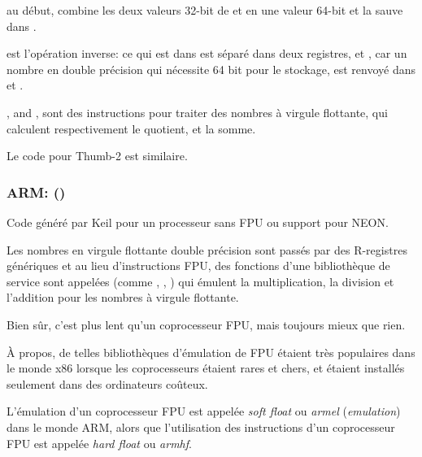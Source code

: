  au début, combine les deux valeurs 32-bit de  et 
en une valeur 64-bit et la sauve dans .

 est l'opération inverse: ce qui est dans  est séparé
dans deux registres,  et , car un nombre en double précision qui
nécessite 64 bit pour le stockage, est renvoyé dans  et .

,  and , 
sont des instructions pour traiter des nombres à virgule flottante, qui calculent
respectivement le \gls{quotient},  et la somme.

Le code pour Thumb-2 est similaire.

\subsubsection{ARM: \OptimizingKeilVI (\ThumbMode)}



Code généré par Keil pour un processeur sans FPU ou support pour NEON.

Les nombres en virgule flottante double précision sont passés par des R-registres
génériques et au lieu d'instructions FPU, des fonctions d'une bibliothèque de service
sont appelées (comme , , )
qui émulent la multiplication, la division et l'addition pour les nombres à virgule
flottante.

Bien sûr, c'est plus lent qu'un coprocesseur FPU, mais toujours mieux que rien.

À propos, de telles bibliothèques d'émulation de FPU étaient très populaires dans
le monde x86 lorsque les coprocesseurs étaient rares et chers, et étaient installés
seulement dans des ordinateurs coûteux.


L'émulation d'un coprocesseur FPU est appelée \emph{soft float} ou \emph{armel} (\emph{emulation})
dans le monde ARM, alors que l'utilisation des instructions d'un coprocesseur FPU
est appelée \emph{hard float} ou \emph{armhf}.

\iffalse

